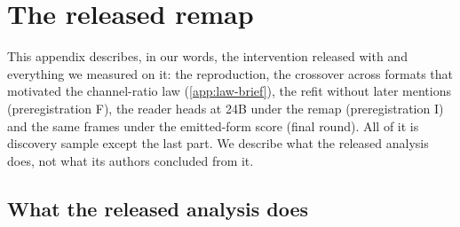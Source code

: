 \section{The released remap}\label{app:remap}\label{sec:intervention}

This appendix describes, in our words, the intervention released with \citet{anonymous2026fitted} and everything we measured on it: the reproduction, the crossover across formats that motivated the channel-ratio law (\cref{app:law-brief}), the refit without later mentions (preregistration F), the reader heads at 24B under the remap (preregistration I) and the same frames under the emitted-form score (final round). All of it is discovery sample except the last part. We describe what the released analysis does, not what its authors concluded from it.

\subsection{What the released analysis does}\label{app:remap-what}

